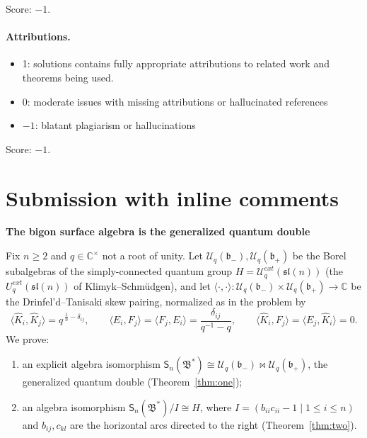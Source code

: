 \documentclass[11pt]{article}
\theoremstyle{definition}
\theoremstyle{remark}
\newcommand{\la}{\langle}
\newcommand{\ra}{\rangle}
\newcommand{\C}{\mathbb{C}}
\newcommand{\Uq}{\mathcal{U}_q}
\newcommand{\bp}{\mathfrak{b}_+}
\newcommand{\bm}{\mathfrak{b}_-}
\newcommand{\B}{\mathfrak{B}}
\newcommand{\Sn}{\mathsf{S}_n}
\newcommand{\del}{\delta}
\newcommand{\ptn}{\bowtie}
\newcommand{\hK}{\hat K}
\begin{document}
\noindent Score: $-1$. 

\paragraph{Attributions.}
\begin{itemize}
	\item  1: solutions contains fully appropriate attributions
		to related work and theorems being used.
	\item  0: moderate issues with missing attributions or hallucinated references
	\item  $-1$: blatant plagiarism or hallucinations
\end{itemize}

\noindent Score: $-1$. 

\newpage
\section{Submission with inline comments}


\begin{center}
{\LARGE\bfseries The bigon surface algebra is the generalized quantum
double}
\end{center}

\bigskip
\noindent
Fix $n\ge2$ and $q\in\C^\times$ not a root of unity.  Let
$\Uq(\bm),\Uq(\bp)$ be the Borel subalgebras of the simply-connected
quantum group $H=\Uq^{ext}(\mathfrak{sl}(n))$ (the
$U_q^{ext}(\mathfrak{sl}(n))$ of Klimyk--Schm\"udgen), and let
$\la\cdot,\cdot\ra:\Uq(\bm)\times\Uq(\bp)\to\C$ be the
Drinfel'd--Tanisaki skew pairing, normalized as in the problem by
\begin{equation}
\la\hK_i,\hK_j\ra=q^{\,\frac1n-\del_{ij}},\qquad
\la E_i,F_j\ra=\la F_j,E_i\ra=\frac{\del_{ij}}{q^{-1}-q},\qquad
\la\hK_i,F_j\ra=\la E_j,\hK_i\ra=0 .
\label{P0}\tag{P0}
\end{equation}
We prove:
\begin{enumerate}[label=(\arabic*),leftmargin=2em]
\item an explicit algebra isomorphism
  $\Sn(\B^*)\cong\Uq(\bm)\ptn\Uq(\bp)$, the generalized quantum double
  (Theorem~\ref{thm:one});
\item an algebra isomorphism $\Sn(\B^*)/I\cong H$, where
  $I=(b_{ii}c_{ii}-1\mid 1\le i\le n)$ and $b_{ij},c_{kl}$ are the
  horizontal arcs directed to the right (Theorem~\ref{thm:two}).
\end{enumerate}
\end{document}
